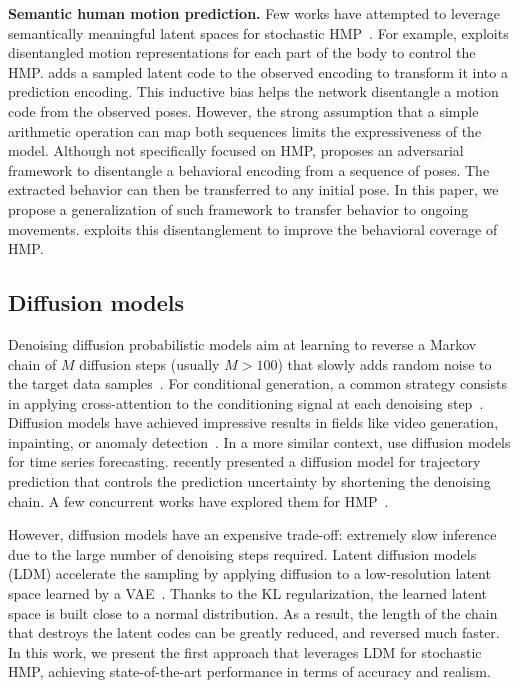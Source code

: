 \documentclass[10pt,twocolumn,letterpaper]{article}
\begin{document}
\textbf{Semantic human motion prediction. } 
Few works have attempted to leverage semantically meaningful latent spaces for stochastic HMP~\cite{yan2018mtvae, liu2021aggregated, gu2022learning}. For example, \cite{gu2022learning} exploits disentangled motion representations for each part of the body to control the HMP. \cite{yan2018mtvae} adds a sampled latent code to the observed encoding to transform it into a prediction encoding. This inductive bias helps the network disentangle a motion code from the observed poses. However, the strong assumption that a simple arithmetic operation can map both sequences limits the expressiveness of the model. Although not specifically focused on HMP, \cite{blattmann2021behavior} proposes an adversarial framework to disentangle a behavioral encoding from a sequence of poses. The extracted behavior can then be transferred to any initial pose. In this paper, we propose a generalization of such framework to transfer behavior to ongoing movements. \modelname{} exploits this disentanglement to improve the behavioral coverage of HMP.

\subsection{Diffusion models}


Denoising diffusion probabilistic models aim at learning to reverse a Markov chain of $M$ diffusion steps (usually $M>100$) that slowly adds random noise to the target data samples~\cite{sohl2015deep, ho2020denoising}. 
For conditional generation, a common strategy consists in applying cross-attention to the conditioning signal at each denoising step~\cite{dhariwal2021diffusionbeatsgans}. 
Diffusion models have achieved impressive results in fields like video generation, inpainting, or anomaly detection~\cite{yang2022diffusionsurvey}. In a more similar context, \cite{rasul2021timegrad, tashiro2021csdi} use diffusion models for time series forecasting. \cite{gu2022stochastic} recently presented a diffusion model for trajectory prediction that controls the prediction uncertainty by shortening the denoising chain. A few concurrent works have explored them for HMP~\cite{saadatnejad2023generic, wei2023human, chen2023humanmac, ahn2023can, chen2023executing}.

However, diffusion models have an expensive trade-off: extremely slow inference due to the large number of denoising steps required. Latent diffusion models (LDM) accelerate the sampling by applying diffusion to a low-resolution latent space learned by a VAE~\cite{vahdat2021score, rombach2022high}. Thanks to the KL regularization, the learned latent space is built close to a normal distribution. As a result, the length of the chain that destroys the latent codes can be greatly reduced, and reversed much faster. In this work, we present the first approach that leverages LDM for stochastic HMP, achieving state-of-the-art performance in terms of accuracy and realism. 
\def\obsT{B}
\def\predT{T}
\def\xmotion{\mathbf{x}_{m}}
\def\obs{\mathbf{X}}
\def\pred{\mathbf{Y}}
\end{document}
